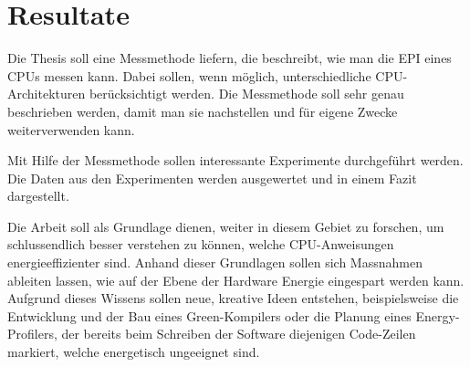 \section{Resultate}

Die Thesis soll eine Messmethode liefern, die beschreibt, wie man die EPI eines CPUs messen kann. Dabei sollen, wenn möglich,
unterschiedliche CPU-Architekturen berücksichtigt werden. Die Messmethode soll sehr genau beschrieben werden, damit man sie
nachstellen und für eigene Zwecke weiterverwenden kann.
\par
Mit Hilfe der Messmethode sollen interessante Experimente durchgeführt werden. Die Daten aus den Experimenten werden ausgewertet
und in einem Fazit dargestellt.
\par
Die Arbeit soll als Grundlage dienen, weiter in diesem Gebiet zu forschen, um schlussendlich besser verstehen zu können,
welche CPU-Anweisungen energieeffizienter sind.
Anhand dieser Grundlagen sollen sich Massnahmen ableiten lassen, wie auf der Ebene der Hardware Energie eingespart werden kann.
Aufgrund dieses Wissens sollen neue, kreative Ideen entstehen, beispielsweise die Entwicklung und der Bau eines Green-Kompilers
oder die Planung eines Energy-Profilers, der bereits beim Schreiben der Software diejenigen Code-Zeilen markiert, welche energetisch
ungeeignet sind.



